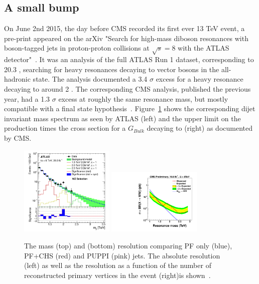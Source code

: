 \subsection{A small bump}
On June 2nd 2015, the day before CMS recorded its first ever 13 TeV event, a pre-print appeared on the arXiv "Search for high-mass diboson resonances with boson-tagged jets in proton-proton collisions at $\sqrt{s} = 8$ \TeV with the ATLAS detector"~\cite{Aad2015}.
It was an analysis of the full ATLAS Run 1 dataset, corresponding to 20.3 \fbinv, searching for heavy resonances decaying to vector bosons in the all-hadronic state. The analysis documented a 3.4 $\sigma$ excess for a heavy resonance decaying to \PW\PZ around 2 \TeV.
The corresponding CMS analysis, published the previous year, had a 1.3 $\sigma$ excess at roughly the same resonance mass, but mostly compatible with a \PW\PW final state hypothesis~\cite{Khachatryan:1700394}. Figure~\ref{fig:searchI:8tev} shows the corresponding dijet invariant mass spectrum as seen by ATLAS (left) and the upper limit on the production times the cross section for a $G_{Bulk}$ decaying to \PW\PW (right)  as documented by CMS.

\begin{figure}[ht] 
    \centering
    \includegraphics[width=0.4\textwidth]{figures/analysis/search1/misc/atlas_8tev.png}
    \includegraphics[width=0.4\textwidth]{figures/analysis/search1/misc/EXO-12-024_gWW.pdf}
    \caption{The mass (top) and \PT (bottom) resolution comparing PF only (blue), PF+CHS (red) and PUPPI (pink) jets. The absolute resolution (left) as well as the resolution as a function of the number of reconstructed primary vertices in the event (right)is shown~\cite{Bertolini2014}.}
    \label{fig:searchI:8tev}
\end{figure}

